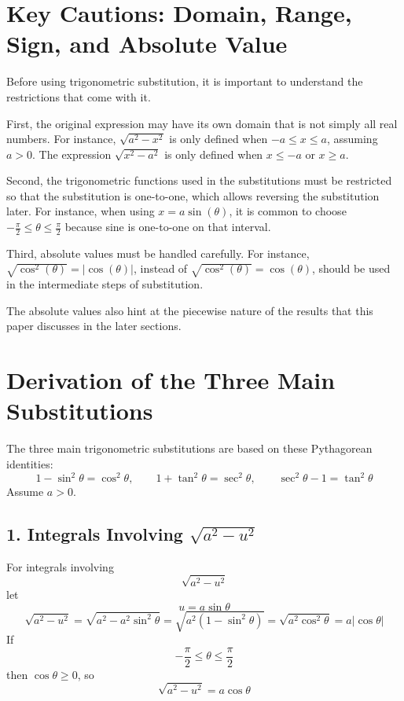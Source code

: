 \documentclass[12pt]{article}
\begin{document}
\section{Key Cautions: Domain, Range, Sign, and Absolute Value}

Before using trigonometric substitution, it is important to understand the restrictions that come with it.

First, the original expression may have its own domain that is not simply all real numbers. For instance, \(\sqrt{a^2 - x^2}\) is only defined when \(-a \le x \le a\), assuming \(a > 0\). The expression \(\sqrt{x^2 - a^2}\) is only defined when \(x \le -a\) or \(x \ge a\).

Second, the trigonometric functions used in the substitutions must be restricted so that the substitution is one-to-one, which allows reversing the substitution later. For instance, when using \(x = a\sin(\theta)\), it is common to choose \(-\frac{\pi}{2} \le \theta \le \frac{\pi}{2}\) because sine is one-to-one on that interval.

Third, absolute values must be handled carefully. For instance, \(\sqrt{\cos^2(\theta)} = |\cos(\theta)|\), instead of \(\sqrt{\cos^2(\theta)} = \cos(\theta)\), should be used in the intermediate steps of substitution.

The absolute values also hint at the piecewise nature of the results that this paper discusses in the later sections.

\section{Derivation of the Three Main Substitutions}

The three main trigonometric substitutions are based on these Pythagorean identities:
\[
1-\sin^2\theta=\cos^2\theta,\qquad
1+\tan^2\theta=\sec^2\theta,\qquad
\sec^2\theta-1=\tan^2\theta
\]
Assume \(a>0\).

\subsection*{1. Integrals Involving \(\sqrt{a^2-u^2}\)}

For integrals involving
\[
\sqrt{a^2-u^2}
\]
let
\[
u=a\sin\theta
\]
\[
\sqrt{a^2-u^2}
=\sqrt{a^2-a^2\sin^2\theta}
=\sqrt{a^2(1-\sin^2\theta)}
=\sqrt{a^2\cos^2\theta}
=a|\cos\theta|
\]
If
\[
-\frac{\pi}{2}\le \theta\le \frac{\pi}{2}
\]
then \(\cos\theta\ge 0\), so
\[
\sqrt{a^2-u^2}=a\cos\theta
\]
\end{document}
